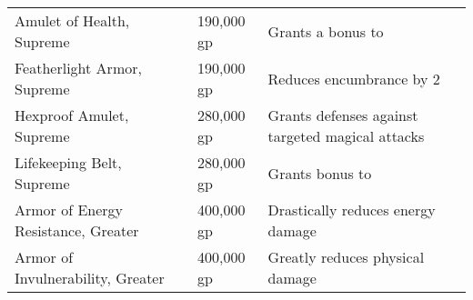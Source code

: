 \begin{longtabuwrapper}
\begin{longtabu}{l l l X l}
Amulet of Health, Supreme &  & 190,000 gp & Grants a  bonus to  & \pageref{item:Amulet of Health, Supreme} \\
Featherlight Armor, Supreme &  & 190,000 gp & Reduces encumbrance by 2 & \pageref{item:Featherlight Armor, Supreme} \\
Hexproof Amulet, Supreme &  & 280,000 gp & Grants  defenses against targeted magical attacks & \pageref{item:Hexproof Amulet, Supreme} \\
Lifekeeping Belt, Supreme &  & 280,000 gp & Grants  bonus to  & \pageref{item:Lifekeeping Belt, Supreme} \\
Armor of Energy Resistance, Greater &  & 400,000 gp & Drastically reduces energy damage & \pageref{item:Armor of Energy Resistance, Greater} \\
Armor of Invulnerability, Greater &  & 400,000 gp & Greatly reduces physical damage & \pageref{item:Armor of Invulnerability, Greater} \\
\end{longtabu}
\end{longtabuwrapper}
